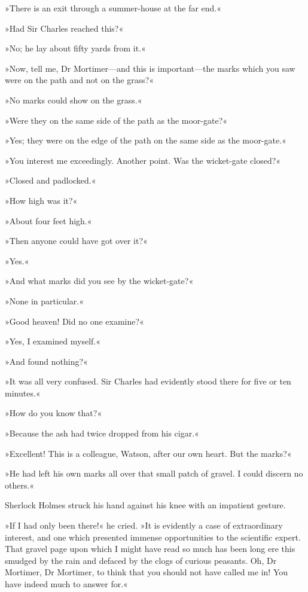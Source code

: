 »There is an exit through a summer-house at the far end.«

»Had Sir Charles reached this?«

»No; he lay about fifty yards from it.«

»Now, tell me, Dr Mortimer\allowbreak---\allowbreak and this is important\allowbreak---\allowbreak the marks which you saw were on the path and not on the grass?«

»No marks could show on the grass.«

»Were they on the same side of the path as the moor-gate?«

»Yes; they were on the edge of the path on the same side as the moor-gate.«

»You interest me exceedingly. Another point. Was the wicket-gate closed?«

»Closed and padlocked.«

»How high was it?«

»About four feet high.«

»Then anyone could have got over it?«

»Yes.«

»And what marks did you see by the wicket-gate?«

»None in particular.«

»Good heaven! Did no one examine?«

»Yes, I examined myself.«

»And found nothing?«

»It was all very confused. Sir Charles had evidently stood there for five or ten minutes.«

»How do you know that?«

»Because the ash had twice dropped from his cigar.«

»Excellent! This is a colleague, Watson, after our own heart. But the marks?«

»He had left his own marks all over that small patch of gravel. I could discern no others.«

Sherlock Holmes struck his hand against his knee with an impatient gesture.

»If I had only been there!« he cried. »It is evidently a case of extraordinary interest, and one which presented immense opportunities to the scientific expert. That gravel page upon which I might have read so much has been long ere this smudged by the rain and defaced by the clogs of curious peasants. Oh, Dr Mortimer, Dr Mortimer, to think that you should not have called me in! You have indeed much to answer for.«

